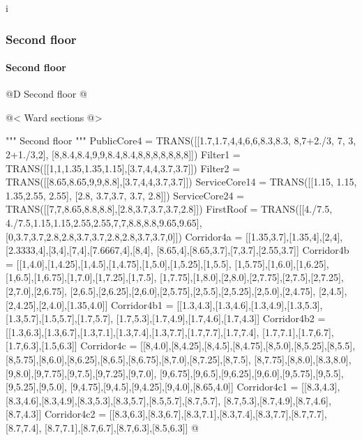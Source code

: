 i\documentclass[11pt,oneside]{article}    %
\begin{document}
\subsubsection{Second floor}
\paragraph{Second floor} 
@D Second floor
@{
@< Ward sections @>

""" Second floor """
PublicCore4 = TRANS([[1.7,1.7,4,4,6,6,8.3,8.3, 8,7+2./3, 7, 3, 2+1./3,2],
    [8,8.4,8.4,9,9,8.4,8.4,8,8,8,8,8,8,8]])
Filter1 = TRANS([[1,1,1.35,1.35,1.15],[3.7,4,4,3.7,3.7]])
Filter2 = TRANS([[8.65,8.65,9,9,8.8],[3.7,4,4,3.7,3.7]])
ServiceCore14 = TRANS([[1.15, 1.15, 1.35,2.55, 2.55], [2.8, 3.7,3.7, 3.7, 2.8]])
ServiceCore24 = TRANS([[7,7,8.65,8.8,8.8],[2.8,3.7,3.7,3.7,2.8]])
FirstRoof = TRANS([[4./7.5, 4./7.5,1.15,1.15,2.55,2.55,7,7,8.8,8.8,9.65,9.65],
    [0,3.7,3.7,2.8,2.8,3.7,3.7,2.8,2.8,3.7,3.7,0]])
Corridor4a = [[1.35,3.7],[1.35,4],[2,4],[2.3333,4],[3,4],[7,4],[7.6667,4],[8,4],
    [8.65,4],[8.65,3.7],[7,3.7],[2.55,3.7]]
Corridor4b = [[1,4.0],[1,4.25],[1,4.5],[1,4.75],[1,5.0],[1,5.25],[1,5.5],
    [1,5.75],[1,6.0],[1,6.25],[1,6.5],[1,6.75],[1,7.0],[1,7.25],[1,7.5],
    [1,7.75],[1,8.0],[2,8.0],[2,7.75],[2,7.5],[2,7.25],[2,7.0],[2,6.75],
    [2,6.5],[2,6.25],[2,6.0],[2,5.75],[2,5.5],[2,5.25],[2,5.0],[2,4.75],
    [2,4.5],[2,4.25],[2,4.0],[1.35,4.0]]
Corridor4b1 = [[1.3,4.3],[1.3,4.6],[1.3,4.9],[1.3,5.3],[1.3,5.7],[1.5,5.7],[1.7,5.7],
    [1.7,5.3],[1.7,4.9],[1.7,4.6],[1.7,4.3]]
Corridor4b2 = [[1.3,6.3],[1.3,6.7],[1.3,7.1],[1.3,7.4],[1.3,7.7],[1.7,7.7],[1.7,7.4],
    [1.7,7.1],[1.7,6.7],[1.7,6.3],[1.5,6.3]]
Corridor4c = [[8,4.0],[8,4.25],[8,4.5],[8,4.75],[8,5.0],[8,5.25],[8,5.5],
    [8,5.75],[8,6.0],[8,6.25],[8,6.5],[8,6.75],[8,7.0],[8,7.25],[8,7.5],
    [8,7.75],[8,8.0],[8.3,8.0],[9,8.0],[9,7.75],[9,7.5],[9,7.25],[9,7.0],
    [9,6.75],[9,6.5],[9,6.25],[9,6.0],[9,5.75],[9,5.5],[9,5.25],[9,5.0],
    [9,4.75],[9,4.5],[9,4.25],[9,4.0],[8.65,4.0]]
Corridor4c1 = [[8.3,4.3],[8.3,4.6],[8.3,4.9],[8.3,5.3],[8.3,5.7],[8.5,5.7],[8.7,5.7],
    [8.7,5.3],[8.7,4.9],[8.7,4.6],[8.7,4.3]]
Corridor4c2 = [[8.3,6.3],[8.3,6.7],[8.3,7.1],[8.3,7.4],[8.3,7.7],[8.7,7.7],[8.7,7.4],
    [8.7,7.1],[8.7,6.7],[8.7,6.3],[8.5,6.3]]
@}
\end{document}
